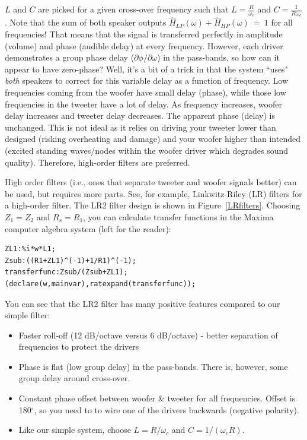 \documentclass[10pt,letterpaper]{book}
\begin{document}
$L$ and $C$ are picked for a given cross-over frequency such that $L=\frac{R}{\omega_c}$ and $C=\frac{1}{R\omega_c}$. Note that the sum of both speaker outputs $\hat{H}_{LP}(\omega)+\hat{H}_{HP}(\omega)~=~1$ for all frequencies! That means that the signal is transferred perfectly in amplitude (volume) and phase (audible delay) at every frequency. However, each driver demonstrates a group phase delay ($\partial \phi / \partial \omega$) in the pass-bands, so how can it appear to have zero-phase? Well, it's a bit of a trick in that the system ``uses"  \textit{both} speakers to correct for this variable delay as a function of frequency. Low frequencies coming from the woofer have small delay (phase), while those low frequencies in the tweeter have a lot of delay. As frequency increases, woofer delay increases and tweeter delay decreases. The apparent phase (delay) is unchanged. This is not ideal as it relies on driving your tweeter lower than designed (risking overheating and damage) and your woofer higher than intended (excited standing waves/nodes within the woofer driver which degrades sound quality). Therefore, high-order filters are preferred.

High order filters (i.e., ones that separate tweeter and woofer signals better) can be used, but requires more parts. See, for example, Linkwitz-Riley (LR) filters for a high-order filter. The LR2 filter design is shown in Figure~\ref{LRfilters}. Choosing $Z_1=Z_2$ and $R_s=R_1$, you can calculate transfer functions in the Maxima computer algebra system (left for the reader):
\begin{verbatim}
ZL1:%i*w*L1;
Zsub:((R1+ZL1)^(-1)+1/R1)^(-1);
transferfunc:Zsub/(Zsub+ZL1);
(declare(w,mainvar),ratexpand(transferfunc));
\end{verbatim}

You can see that the LR2 filter has many positive features compared to our simple filter:
\begin{itemize}
\item Faster roll-off (12 dB/octave versus 6 dB/octave) - better separation of frequencies to protect the drivers
\item Phase is flat (low group delay) in the pass-bands. There is, however, some group delay around cross-over.
\item Constant phase offset between woofer \& tweeter for all frequencies. Offset is 180$^\circ$, so you need to to wire one of the drivers backwards (negative polarity).
\item Like our simple system, choose $L=R/\omega_c$ and $C=1/(\omega_c R)$.
\end{itemize}
\end{document}
